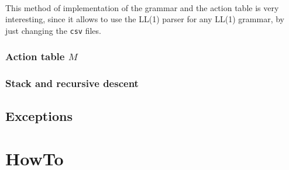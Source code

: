 \documentclass[letterpaper]{article}
\begin{document}
\paragraph{}

This method of implementation of the grammar and the action table is very
interesting, since it allows to use the LL(1) parser for any LL(1) grammar,
by just changing the \texttt{csv} files.

\subsubsection{Action table $M$}

\label{implactiontable}

\subsubsection{Stack and recursive descent}

\label{implstack}

\subsection{Exceptions}

\label{exceptionhandling}


\section{HowTo}

\label{howto}
\end{document}
